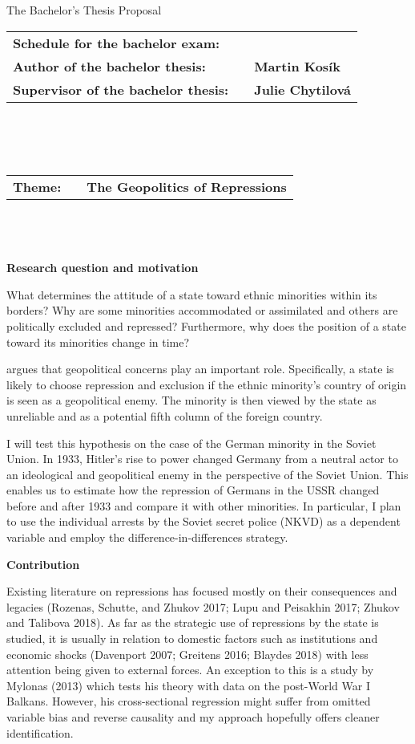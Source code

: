 \pagestyle{empty}
\begin{center}
\LARGE{The Bachelor’s Thesis Proposal}
\end{center}
\vspace{5mm}
\begin{tabular}{lcl}
\large{\bf Schedule for the bachelor exam:} & & \\
\large{\bf Author of the bachelor thesis:} & & \large{\bf Martin Kosík}\\
\large{\bf Supervisor of the bachelor thesis:} & & \large{\bf Julie Chytilová}
\end{tabular}
\\
\\
\\
\begin{tabular}{lcl}
\large{\bf Theme:} & & \large{\bf The Geopolitics of Repressions}
\end{tabular}\\
\\
\\
\large{\bf Research question and motivation}

\noindent
What determines the attitude of a state toward ethnic minorities within its borders? Why are some minorities accommodated or assimilated and others are politically excluded and repressed? Furthermore, why does the position of a state toward its minorities change in time? 

\citet{mylonas_politics_2013} argues that geopolitical concerns play an important role. Specifically, a state is likely to choose repression and exclusion if the ethnic minority's country of origin is seen as a geopolitical enemy. The minority is then viewed by the state as unreliable and as a potential fifth column of the foreign country. 

I will test this hypothesis on the case of the German minority in the Soviet Union. In 1933, Hitler’s rise to power changed Germany from a neutral actor to an ideological and geopolitical enemy in the perspective of the Soviet Union. This enables us to estimate how the repression of Germans in the USSR changed before and after 1933 and compare it with other minorities. In particular, I plan to use the individual arrests by the Soviet secret police (NKVD) as a dependent variable and employ the difference-in-differences strategy. 

\noindent  \large{\bf Contribution}

\noindent Existing literature on repressions has focused mostly on their consequences and legacies (Rozenas, Schutte, and Zhukov 2017; Lupu and Peisakhin 2017; Zhukov and Talibova 2018). As far as the strategic use of repressions by the state is studied, it is usually in relation to domestic factors such as institutions and economic shocks (Davenport 2007; Greitens 2016; Blaydes 2018) with less attention being given to external forces. An exception to this is a study by Mylonas (2013) which tests his theory with data on the post-World War I Balkans. However, his cross-sectional regression might suffer from omitted variable bias and reverse causality and my approach hopefully offers cleaner identification. 

